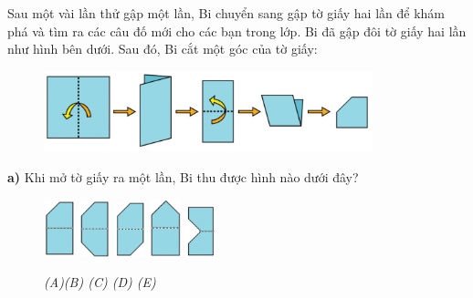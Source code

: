 Sau một vài lần thử gập một lần, Bi chuyển sang gập tờ giấy hai lần để khám phá và tìm ra các câu đố mới cho các bạn trong lớp.
\vskip 0.1cm
Bi đã gập đôi tờ giấy hai lần như hình bên dưới. Sau đó, Bi cắt một góc của tờ giấy: 
\begin{figure}[H]
	\captionsetup{labelformat=empty}
	\vspace*{5pt}
	\centering
	\captionsetup{justification=raggedleft}
	\includegraphics[width =0.85\textwidth]{cat-7a}
\end{figure}
\textbf{a)} Khi mở tờ giấy ra một lần, Bi thu được hình nào dưới đây?
\begin{figure}[H]
	\centering
	\captionsetup{labelformat=empty}
	\vspace*{-4pt}
	\captionsetup{justification=centering}
	\includegraphics[width =0.08\textwidth]{cat-8a}
	\hfill
	\includegraphics[width =0.08\textwidth]{cat-8b}
	\hfill
	\includegraphics[width =0.08\textwidth]{cat-8c}
	\hfill
	\includegraphics[width =0.08\textwidth]{cat-8d}
	\hfill
	\includegraphics[width =0.08\textwidth]{cat-8e}	
	\caption{\small \it (A)\hfill (B) \hfill (C) \hfill (D) \hfill (E)}
	\vspace*{-10pt}
\end{figure}

